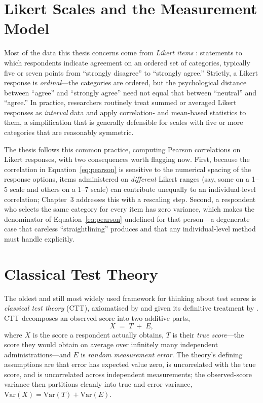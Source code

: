 \section{Likert Scales and the Measurement Model}

Most of the data this thesis concerns come from \emph{Likert items}
\parencite{likert1932technique}: statements to which respondents indicate
agreement on an ordered set of categories, typically five or seven points from
``strongly disagree'' to ``strongly agree.'' Strictly, a Likert response is
\emph{ordinal}---the categories are ordered, but the psychological distance
between ``agree'' and ``strongly agree'' need not equal that between ``neutral''
and ``agree.'' In practice, researchers routinely treat summed or averaged
Likert responses as \emph{interval} data and apply correlation- and
mean-based statistics to them, a simplification that is generally defensible for
scales with five or more categories that are reasonably symmetric.

The thesis follows this common practice, computing Pearson correlations on
Likert responses, with two consequences worth flagging now. First, because the
correlation in Equation~\ref{eq:pearson} is sensitive to the numerical spacing
of the response options, items administered on \emph{different} Likert ranges
(say, some on a 1--5 scale and others on a 1--7 scale) can contribute unequally
to an individual-level correlation; Chapter~3 addresses this with a rescaling
step. Second, a respondent who selects the same category for every item has zero
variance, which makes the denominator of Equation~\ref{eq:pearson} undefined for
that person---a degenerate case that careless ``straightlining'' produces and
that any individual-level method must handle explicitly.

\section{Classical Test Theory}
\label{sec:ctt}

The oldest and still most widely used framework for thinking about test scores
is \emph{classical test theory} (CTT), axiomatised by
\textcite{novick1966axioms} and given its definitive treatment by
\textcite{lordnovick1968statistical}. CTT decomposes an observed score into two
additive parts,
\begin{equation}
X \;=\; T \;+\; E,
\label{eq:ctt}
\end{equation}
where $X$ is the score a respondent actually obtains, $T$ is their \emph{true
score}---the score they would obtain on average over infinitely many
independent administrations---and $E$ is \emph{random measurement error}. The
theory's defining assumptions are that error has expected value zero, is
uncorrelated with the true score, and is uncorrelated across independent
measurements; the observed-score variance then partitions cleanly into true and
error variance, $\mathrm{Var}(X) = \mathrm{Var}(T) + \mathrm{Var}(E)$.

